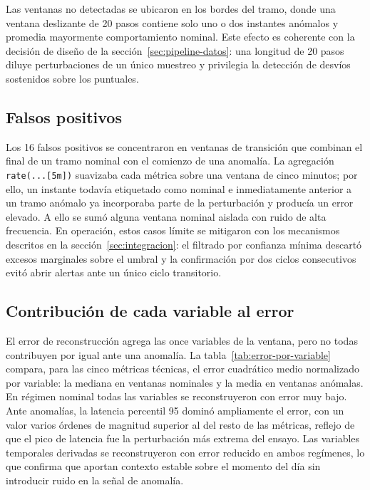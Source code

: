 Las ventanas no detectadas se ubicaron en los bordes del tramo, donde una ventana deslizante de 20 pasos contiene solo uno o dos instantes anómalos y promedia mayormente comportamiento nominal. Este efecto es coherente con la decisión de diseño de la sección~\ref{sec:pipeline-datos}: una longitud de 20 pasos diluye perturbaciones de un único muestreo y privilegia la detección de desvíos sostenidos sobre los puntuales.

\subsection{Falsos positivos}

Los 16 falsos positivos se concentraron en ventanas de transición que combinan el final de un tramo nominal con el comienzo de una anomalía. La agregación \texttt{rate(...[5m])} suavizaba cada métrica sobre una ventana de cinco minutos; por ello, un instante todavía etiquetado como nominal e inmediatamente anterior a un tramo anómalo ya incorporaba parte de la perturbación y producía un error elevado. A ello se sumó alguna ventana nominal aislada con ruido de alta frecuencia. En operación, estos casos límite se mitigaron con los mecanismos descritos en la sección~\ref{sec:integracion}: el filtrado por confianza mínima descartó excesos marginales sobre el umbral y la confirmación por dos ciclos consecutivos evitó abrir alertas ante un único ciclo transitorio.

\subsection{Contribución de cada variable al error}

El error de reconstrucción agrega las once variables de la ventana, pero no todas contribuyen por igual ante una anomalía. La tabla~\ref{tab:error-por-variable} compara, para las cinco métricas técnicas, el error cuadrático medio normalizado por variable: la mediana en ventanas nominales y la media en ventanas anómalas. En régimen nominal todas las variables se reconstruyeron con error muy bajo. Ante anomalías, la latencia percentil 95 dominó ampliamente el error, con un valor varios órdenes de magnitud superior al del resto de las métricas, reflejo de que el pico de latencia fue la perturbación más extrema del ensayo. Las variables temporales derivadas se reconstruyeron con error reducido en ambos regímenes, lo que confirma que aportan contexto estable sobre el momento del día sin introducir ruido en la señal de anomalía.

